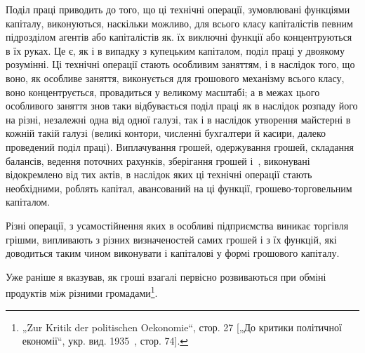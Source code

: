 Поділ праці приводить до того, що ці технічні операції, зумовлювані
функціями капіталу, виконуються, наскільки можливо,
для всього класу капіталістів певним підрозділом агентів або
капіталістів як. їх виключні функції або концентруються в їх
руках. Це є, як і в випадку з купецьким капіталом, поділ праці
у двоякому розумінні. Ці технічні операції стають особливим заняттям,
і в наслідок того, що воно, як особливе заняття, виконується
для грошового механізму всього класу, воно концентрується, провадиться
у великому масштабі; а в межах цього особливого заняття
знов таки відбувається поділ праці як в наслідок розпаду його
на різні, незалежні одна від одної галузі, так і в наслідок утворення
майстерні в кожній такій галузі (великі контори, численні
бухгалтери й касири, далеко проведений поділ праці).
Виплачування грошей, одержування грошей, складання балансів,
ведення поточних рахунків, зберігання грошей і~, виконувані
відокремлено від тих актів, в наслідок яких ці технічні операції
стають необхідними, роблять капітал, авансований на ці
функції, грошево-торговельним капіталом.

Різні операції, з усамостійнення яких в особливі підприємства
виникає торгівля грішми, випливають з різних визначеностей
самих грошей і з їх функцій, які доводиться таким чином виконувати
і капіталові у формі грошового капіталу.

Уже раніше я вказував, як гроші взагалі первісно розвиваються
при обміні продуктів між різними громадами\footnote{
„Zur Kritik der politischen Oekonomie“, стор. 27 [„До критики політичної
економії“, укр. вид. 1935~, стор. 74].
}.

